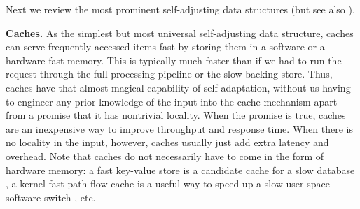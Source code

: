 Next we review the most prominent self-adjusting data structures (but see also \cite{BoseDL08, Avin0020, ParkM12}).


\noindent%
\textbf{Caches.} %
As the simplest but most universal self-adjusting data structure, caches can serve frequently accessed items fast by storing them in a  software or a hardware fast memory. This is typically much faster than if we had to run the request through the full processing pipeline or the slow backing store. Thus, caches have that almost magical capability of self-adaptation, without us having to engineer any prior knowledge of the input into the cache mechanism apart from a promise that it has nontrivial locality. When the promise is true, caches are an inexpensive way to improve throughput and response time. When there is no locality in the input, however, caches usually just add extra latency and overhead.
%
Note that caches do not necessarily have to come in the form of hardware memory: a fast key-value store is a candidate cache for a slow database \cite{10.5555/1012889.1012894}, a kernel fast-path flow cache is a useful way to speed up a slow user-space software switch \cite{188960}, etc.



